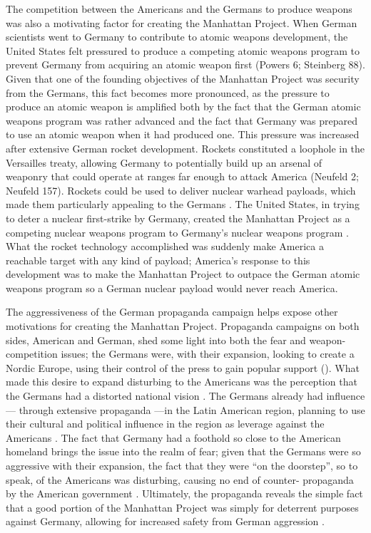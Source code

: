 \documentclass[a4paper,12pt]{article}
\begin{document}
        The competition between the Americans and the Germans to produce weapons was also a
        motivating factor for creating the Manhattan Project. When German scientists went to Germany
        to contribute to atomic weapons development, the United States felt pressured to produce a
        competing atomic weapons program to prevent Germany from acquiring an atomic weapon first
        (Powers 6; Steinberg 88). Given that one of the founding objectives of the Manhattan Project
        was security from the Germans, this fact becomes more pronounced, as the pressure to produce
        an atomic weapon is amplified both by the fact that the German atomic weapons program was
        rather advanced and the fact that Germany was prepared to use an atomic weapon when it had
        produced one. This pressure was increased after extensive German rocket development. Rockets
        constituted a loophole in the Versailles treaty, allowing Germany to potentially build up an
        arsenal of weaponry that could operate at ranges far enough to attack America (Neufeld 2;
        Neufeld 157). Rockets could be used to deliver nuclear warhead payloads, which made them
        particularly appealing to the Germans \cite[157]{neufeldm}. The United States, in trying to
        deter a nuclear first-strike by Germany, created the Manhattan Project as a competing
        nuclear weapons program to Germany's nuclear weapons program \cite[89]{steinbergg}. What the
        rocket technology accomplished was suddenly make America a reachable target with any kind of
        payload; America's response to this development was to make the Manhattan Project to outpace
        the German atomic weapons program so a German nuclear payload would never reach America.    

        The aggressiveness of the German propaganda campaign helps expose other motivations for
        creating the Manhattan Project. Propaganda campaigns on both sides, American and German,
        shed some light into both the fear and weapon-competition issues; the Germans were, with
        their expansion, looking to create a Nordic Europe, using their control of the press to gain
        popular support (\cites[142]{guettelj}[1]{bergend}). What made this desire to expand
        disturbing to the Americans was the perception that the Germans had a distorted national
        vision \cite[37]{kallisa}. The Germans already had influence--- through extensive propaganda
        ---in the Latin American region, planning to use their cultural and political influence in
        the region as leverage against the Americans \cite[2,17]{pyensonl}. The fact that Germany
        had a foothold so close to the American homeland brings the issue into the realm of fear;
        given that the Germans were so aggressive with their expansion, the fact that they were ``on
        the doorstep'', so to speak, of the Americans was disturbing, causing no end of counter-
        propaganda by the American government \cite[2]{lauriec}. Ultimately, the propaganda reveals
        the simple fact that a good portion of the Manhattan Project was simply for deterrent
        purposes against Germany, allowing for increased safety from German aggression
        \cite[140]{grovesl}.
\end{document}
